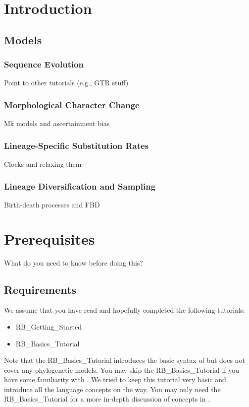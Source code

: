 
\section{Introduction}

\citet{Ronquist2012a}

\subsection{Models}

\subsubsection{Sequence Evolution}

Point to other tutorials (e.g., GTR stuff)

\subsubsection{Morphological Character Change}

Mk models and ascertainment bias

\subsubsection{Lineage-Specific Substitution Rates}

Clocks \citep{Zuckerkandl1962} and relaxing them 

\subsubsection{Lineage Diversification and Sampling}

Birth-death processes and FBD

\section{Prerequisites}

What do you need to know before doing this?

\subsection{Requirements}
We assume that you have read and hopefully completed the following tutorials:
\begin{itemize}
\item RB\_Getting\_Started
\item RB\_Basics\_Tutorial
\end{itemize}
Note that the RB\_Basics\_Tutorial introduces the basic syntax of \Rev but does not cover any phylogenetic models.
You may skip the RB\_Basics\_Tutorial if you have some familiarity with \R.
We tried to keep this tutorial very basic and introduce all the language concepts on the way.
You may only need the RB\_Basics\_Tutorial for a more in-depth discussion of concepts in \Rev.


